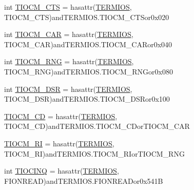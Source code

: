 \begin{DoxyCompactItemize}
\item 
int \hyperlink{namespaceserial_1_1serialposix_ae0c61e1ac0b3c8c3f038f00f0fafc055}{T\+I\+O\+C\+M\+\_\+\+C\+TS} = hasattr(\hyperlink{namespaceserial_1_1serialposix_ad56e7a51b0acdb47ce56707e4b7560b8}{T\+E\+R\+M\+I\+OS}, \textquotesingle{}T\+I\+O\+C\+M\+\_\+\+C\+TS\textquotesingle{})and\+T\+E\+R\+M\+I\+O\+S.\+T\+I\+O\+C\+M\+\_\+\+C\+T\+Sor0x020
\item 
int \hyperlink{namespaceserial_1_1serialposix_a39249ce5d46f12bdd4e54d2da1405d31}{T\+I\+O\+C\+M\+\_\+\+C\+AR} = hasattr(\hyperlink{namespaceserial_1_1serialposix_ad56e7a51b0acdb47ce56707e4b7560b8}{T\+E\+R\+M\+I\+OS}, \textquotesingle{}T\+I\+O\+C\+M\+\_\+\+C\+AR\textquotesingle{})and\+T\+E\+R\+M\+I\+O\+S.\+T\+I\+O\+C\+M\+\_\+\+C\+A\+Ror0x040
\item 
int \hyperlink{namespaceserial_1_1serialposix_a95c1ec661ce3749f6b0893557861ad16}{T\+I\+O\+C\+M\+\_\+\+R\+NG} = hasattr(\hyperlink{namespaceserial_1_1serialposix_ad56e7a51b0acdb47ce56707e4b7560b8}{T\+E\+R\+M\+I\+OS}, \textquotesingle{}T\+I\+O\+C\+M\+\_\+\+R\+NG\textquotesingle{})and\+T\+E\+R\+M\+I\+O\+S.\+T\+I\+O\+C\+M\+\_\+\+R\+N\+Gor0x080
\item 
int \hyperlink{namespaceserial_1_1serialposix_a3b74007c7564c28114277c258b1c2e6f}{T\+I\+O\+C\+M\+\_\+\+D\+SR} = hasattr(\hyperlink{namespaceserial_1_1serialposix_ad56e7a51b0acdb47ce56707e4b7560b8}{T\+E\+R\+M\+I\+OS}, \textquotesingle{}T\+I\+O\+C\+M\+\_\+\+D\+SR\textquotesingle{})and\+T\+E\+R\+M\+I\+O\+S.\+T\+I\+O\+C\+M\+\_\+\+D\+S\+Ror0x100
\item 
\hyperlink{namespaceserial_1_1serialposix_a5250edc9016f47b5efd626675bb9adee}{T\+I\+O\+C\+M\+\_\+\+CD} = hasattr(\hyperlink{namespaceserial_1_1serialposix_ad56e7a51b0acdb47ce56707e4b7560b8}{T\+E\+R\+M\+I\+OS}, \textquotesingle{}T\+I\+O\+C\+M\+\_\+\+CD\textquotesingle{})and\+T\+E\+R\+M\+I\+O\+S.\+T\+I\+O\+C\+M\+\_\+\+C\+Dor\+T\+I\+O\+C\+M\+\_\+\+C\+AR
\item 
\hyperlink{namespaceserial_1_1serialposix_a25b961f0b21e0237dd842ac4065d54e2}{T\+I\+O\+C\+M\+\_\+\+RI} = hasattr(\hyperlink{namespaceserial_1_1serialposix_ad56e7a51b0acdb47ce56707e4b7560b8}{T\+E\+R\+M\+I\+OS}, \textquotesingle{}T\+I\+O\+C\+M\+\_\+\+RI\textquotesingle{})and\+T\+E\+R\+M\+I\+O\+S.\+T\+I\+O\+C\+M\+\_\+\+R\+Ior\+T\+I\+O\+C\+M\+\_\+\+R\+NG
\item 
int \hyperlink{namespaceserial_1_1serialposix_a0e101a9083b270263a12c1f446ee36bf}{T\+I\+O\+C\+I\+NQ} = hasattr(\hyperlink{namespaceserial_1_1serialposix_ad56e7a51b0acdb47ce56707e4b7560b8}{T\+E\+R\+M\+I\+OS}, \textquotesingle{}F\+I\+O\+N\+R\+E\+AD\textquotesingle{})and\+T\+E\+R\+M\+I\+O\+S.\+F\+I\+O\+N\+R\+E\+A\+Dor0x541B

\end{DoxyCompactItemize}
